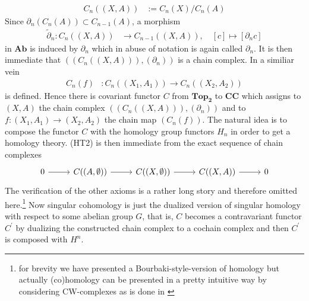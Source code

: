 \begin{align*}
  C_{n}((X,A))
  &:=
  C_{n}(X)
  /
  C_{n}(A)
\end{align*}
Since $\partial_{n}(C_{n}(A)) \subset C_{n-1}(A)$, a morphism
\begin{align*}
  \tilde{\partial}_{n}
  \colon
  C_{n}((X,A))
  &\to
  C_{n-1}((X,A))
  ,\quad
  [c]
  \mapsto
  [\partial_{n}c]
\end{align*}
in $\mathbf{Ab}$ is induced by $\partial_{n}$ which in abuse of notation is again called $\partial_{n}$. It is then immediate that $((C_{n}((X,A))),(\partial_{n}))$ is a chain complex. In a similiar vein
\begin{align*}
  C_{n}(f)
  &\colon
  C_{n}((X_{1},A_{1}))
  \to
  C_{n}((X_{2},A_{2}))
\end{align*}
is defined. Hence there is covariant functor $C$ from $\mathbf{Top_{2}}$ to $\mathbf{CC}$ which assigns to $(X,A)$ the chain complex $((C_{n}((X,A))),(\partial_{n}))$ and to $f \colon (X_{1},A_{1}) \to (X_{2},A_{2})$ the chain map $(C_{n}(f))$. The natural idea is to compose the functor $C$ with the homology group functors $H_{n}$ in order to get a homology theory. (HT2) is then immediate from the exact sequence of chain complexes
\begin{equation*}
\begin{tikzcd}[row sep=2.2em,column sep=2.6em]
  0
  \ar{r}
  &
  C((A,\emptyset))
  \ar{r}
  &
  C((X,\emptyset))
  \ar{r}
  &
  C((X,A))
  \ar{r}
  &
  0
\end{tikzcd}
\end{equation*}
The verification of the other axioms is a rather long story and therefore omitted here.\footnote{for brevity we have presented a {\glqq}Bourbaki-style{\grqq}-version of homology but actually (co)homology can be presented in a pretty intuitive way by considering CW-complexes as is done in \cite{8b5861fc}} Now singular cohomology is just the dualized version of singular homology with respect to some abelian group $G$, that is, $C$ becomes a contravariant functor $C^{\prime}$ by dualizing the constructed chain complex to a cochain complex and then $C^{\prime}$ is composed with $H^{n}$.
